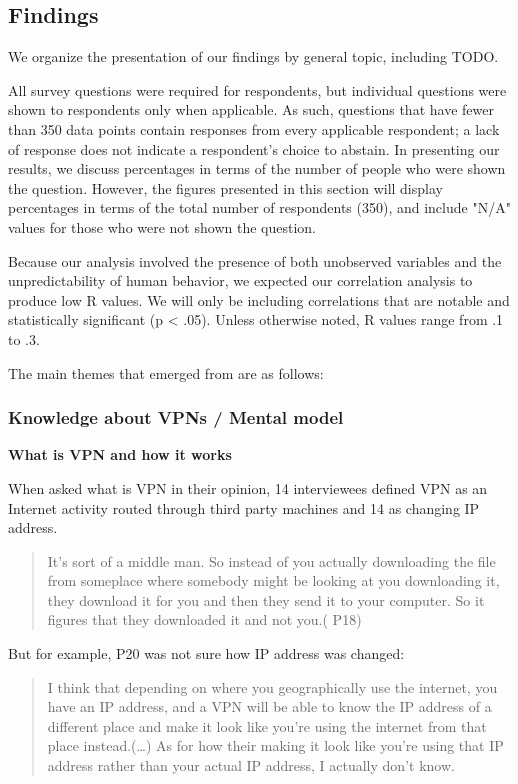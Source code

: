 \subsection{Findings}\label{Findings}

We organize the presentation of our findings by general topic, including TODO.

All survey questions were required for respondents, but individual questions were shown to respondents only when applicable. As such, questions that have fewer than 350 data points contain responses from every applicable respondent; a lack of response does not indicate a respondent's choice to abstain. In presenting our results, we discuss percentages in terms of the number of people who were shown the question. However, the figures presented in this section will display percentages in terms of the total number of respondents (350), and include "N/A" values for those who were not shown the question.

Because our analysis involved the presence of both unobserved variables and the unpredictability of human behavior, we expected our correlation analysis to produce low R values. We will only be including correlations that are notable and statistically significant (p < .05). Unless otherwise noted, R values range from .1 to .3.


The main themes that emerged from are as follows: 

\subsubsection{Knowledge about VPNs / Mental model}

\textbf{What is VPN and how it works}

When asked what is VPN in their opinion, 14 interviewees defined VPN as an Internet activity routed through third party machines and 14 as changing IP address. 
\begin{quote}It's sort of a middle man. So instead of you actually downloading the file from someplace where somebody might be looking at you downloading it, they download it for you and then they send it to your computer. So it figures that they downloaded it and not you.( P18)\end{quote}


But for example, P20 was not sure how IP address was changed:
\begin{quote}I think that depending on where you geographically use the internet, you have an IP address, and a VPN will be able to know the IP address of a different place and make it look like you're using the internet from that place instead.(\dots) As for how their making it look like you're using that IP address rather than your actual IP address, I actually don't know.\end{quote}


